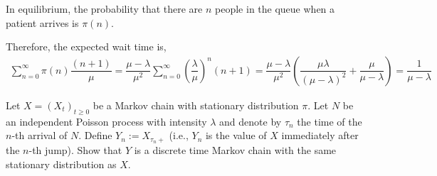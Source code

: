 \begin{solution}[Solution]
In equilibrium, the probability that there are \( n \) people in the queue when a patient arrives is \( \pi(n) \). 

Therefore, the expected wait time is,
\begin{align*}
    \sum_{n=0}^{\infty} \pi(n) \dfrac{(n+1)}{\mu} 
    = \dfrac{\mu-\lambda}{\mu^2}\sum_{n=0}^{\infty} \left( \dfrac{\lambda}{\mu} \right)^n (n+1) 
    = \dfrac{\mu-\lambda}{\mu^2} \left( \dfrac{\mu\lambda}{(\mu-\lambda)^2}+\dfrac{\mu}{\mu-\lambda} \right)
    = \dfrac{1}{\mu-\lambda}
\end{align*}
\end{solution}

\begin{problem}[Exercise 5.2]
    Let \( X = (X_t)_{t\geq 0} \) be a Markov chain with stationary distribution \( \pi \). Let \( N \) be an independent Poisson process with intensity \( \lambda \) and denote by \( \tau_n \) the time of the \( n \)-th arrival of \( N \). Define \( Y_n:=X_{\tau_n+} \) (i.e., \( Y_n \) is the value of \( X \) immediately after the \( n \)-th jump). Show that \( Y \) is a discrete time Markov chain with the same stationary distribution as \( X \).
\end{problem}

